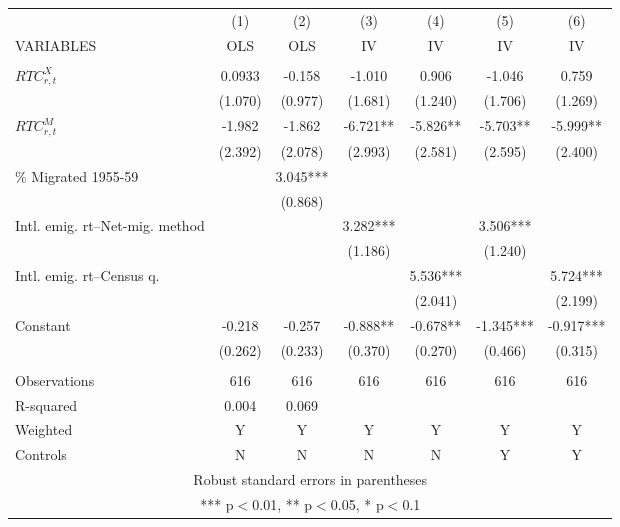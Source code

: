 \begin{tabular}{lcccccc} \hline
 & (1) & (2) & (3) & (4) & (5) & (6) \\
VARIABLES & OLS & OLS & IV & IV & IV & IV \\ \hline
 &  &  &  &  &  &  \\
$ RTC_{r,t}^X$ & 0.0933 & -0.158 & -1.010 & 0.906 & -1.046 & 0.759 \\
 & (1.070) & (0.977) & (1.681) & (1.240) & (1.706) & (1.269) \\
$ RTC_{r,t}^M$ & -1.982 & -1.862 & -6.721** & -5.826** & -5.703** & -5.999** \\
 & (2.392) & (2.078) & (2.993) & (2.581) & (2.595) & (2.400) \\
\% Migrated 1955-59 &  & 3.045*** &  &  &  &  \\
 &  & (0.868) &  &  &  &  \\
Intl. emig. rt--Net-mig. method &  &  & 3.282*** &  & 3.506*** &  \\
 &  &  & (1.186) &  & (1.240) &  \\
Intl. emig. rt--Census q. &  &  &  & 5.536*** &  & 5.724*** \\
 &  &  &  & (2.041) &  & (2.199) \\
Constant & -0.218 & -0.257 & -0.888** & -0.678** & -1.345*** & -0.917*** \\
 & (0.262) & (0.233) & (0.370) & (0.270) & (0.466) & (0.315) \\
 &  &  &  &  &  &  \\
Observations & 616 & 616 & 616 & 616 & 616 & 616 \\
R-squared & 0.004 & 0.069 &  &  &  &  \\
Weighted & Y & Y & Y & Y & Y & Y \\
 Controls & N & N & N & N & Y & Y \\ \hline
\multicolumn{7}{c}{ Robust standard errors in parentheses} \\
\multicolumn{7}{c}{ *** p$<$0.01, ** p$<$0.05, * p$<$0.1} \\
\end{tabular}
